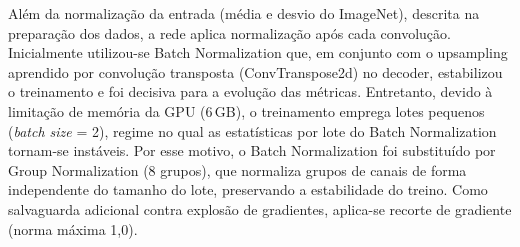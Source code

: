 \documentclass[10pt,a4paper,twocolumn]{article}
\begin{document}
\begin{table}[H]
\centering
\caption{Detalhamento das camadas da U-Net (entrada RGB). Bloco duplo $=2\times$(Conv $3\times3$ pad 1 $+$ GroupNorm(8) $+$ ReLU); ConvT $=$ convolução transposta $2\times2$ (passo 2); concat $=$ concatenação com o \textit{skip} do encoder.}
\label{tab:unet}
\end{table}

Além da normalização da entrada (média e desvio do ImageNet), descrita na preparação dos dados, a rede aplica normalização após cada convolução. Inicialmente utilizou-se Batch Normalization que, em conjunto com o upsampling aprendido por convolução transposta (ConvTranspose2d) no decoder, estabilizou o treinamento e foi decisiva para a evolução das métricas. Entretanto, devido à limitação de memória da GPU (6\,GB), o treinamento emprega lotes pequenos (\textit{batch size} = 2), regime no qual as estatísticas por lote do Batch Normalization tornam-se instáveis. Por esse motivo, o Batch Normalization foi substituído por Group Normalization (8 grupos), que normaliza grupos de canais de forma independente do tamanho do lote, preservando a estabilidade do treino. Como salvaguarda adicional contra explosão de gradientes, aplica-se recorte de gradiente (norma máxima 1,0).
\end{document}
